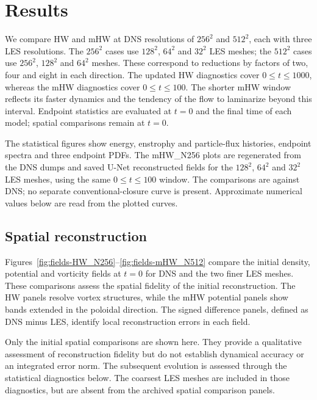 \documentclass[authoryear,preprint,review,12pt]{elsarticle}
\begin{document}
%
%
%
%
%
%
%
\section{Results}\label{sec:Results}

We compare HW and mHW at DNS resolutions of $256^2$ and $512^2$, each with three LES resolutions. The $256^2$ cases use $128^2$, $64^2$ and $32^2$ LES meshes; the $512^2$ cases use $256^2$, $128^2$ and $64^2$ meshes. These correspond to reductions by factors of two, four and eight in each direction. The updated HW diagnostics cover $0\leq t\leq1000$, whereas the mHW diagnostics cover $0\leq t\leq100$. The shorter mHW window reflects its faster dynamics and the tendency of the flow to laminarize beyond this interval. Endpoint statistics are evaluated at $t=0$ and the final time of each model; spatial comparisons remain at $t=0$.

The statistical figures show energy, enstrophy and particle-flux histories, endpoint spectra and three endpoint PDFs. The mHW\_N256 plots are regenerated from the DNS dumps and saved U-Net reconstructed fields for the $128^2$, $64^2$ and $32^2$ LES meshes, using the same $0\leq t\leq100$ window. The comparisons are against DNS; no separate conventional-closure curve is present. Approximate numerical values below are read from the plotted curves.

\subsection{Spatial reconstruction}

Figures~\ref{fig:fields-HW_N256}--\ref{fig:fields-mHW_N512} compare the initial density, potential and vorticity fields at $t=0$ for DNS and the two finer LES meshes. These comparisons assess the spatial fidelity of the initial reconstruction. The HW panels resolve vortex structures, while the mHW potential panels show bands extended in the poloidal direction. The signed difference panels, defined as DNS minus LES, identify local reconstruction errors in each field.

Only the initial spatial comparisons are shown here. They provide a qualitative assessment of reconstruction fidelity but do not establish dynamical accuracy or an integrated error norm. The subsequent evolution is assessed through the statistical diagnostics below. The coarsest LES meshes are included in those diagnostics, but are absent from the archived spatial comparison panels.
\end{document}
